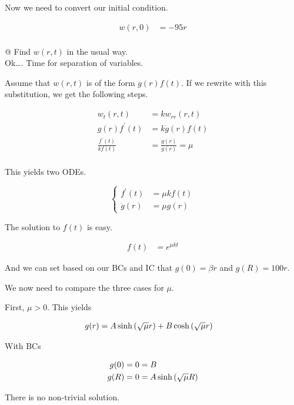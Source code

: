 \documentclass[10pt]{article}
\begin{document}
\begin{easylist}[enumerate]
    Now we need to convert our initial condition.

    \begin{align*}
        w(r, 0) &= -95 r\\
    \end{align*}

    @ Find $w(r, t)$ in the usual way.\\

    Ok\ldots. Time for separation of variables.

    Assume that $w(r, t)$ is of the form $g(r)f(t)$. If we rewrite with this substitution, we get the following steps.

    \begin{align*}
        w_t(r, t) &= k w_{rr}{\left (r , t\right )}\\
        g(r)f^\prime(t) &= k \ddot{g}(r)f(t)\\
        \frac{f^\prime(t)}{kf(t)} &= \frac{\ddot{g}(r)}{g(r)} = \mu\\
    \end{align*}

    This yields two ODEs.

    \[
    \begin{cases}
        f^\prime(t) &= \mu k f(t)\\
        \ddot{g}(r) &= \mu g(r)
    \end{cases}
    \]

    The solution to $f(t)$ is easy.

    \begin{align*}
        f(t) &= e^{\mu k t}
    \end{align*}

    And we can set based on our BCs and IC that $g(0) = \beta r$ and $g(R) = 100 r$.

    We now need to compare the three cases for $\mu$.

    First, $\mu > 0$. This yields

    \begin{align*}
        g(r) &= A \sinh\left( \sqrt{\mu}r \right) + B \cosh\left( \sqrt{\mu}r \right)
    \end{align*}

    With BCs

    \begin{align*}
        g(0) &= 0 = B\\
        g(R) &= 0 = A \sinh\left( \sqrt{\mu}R \right)
    \end{align*}

    There is no non-trivial solution.


\end{easylist}
\end{document}
